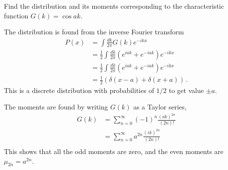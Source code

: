 

Find the distribution and its moments corresponding to the characteristic function $G(k) = \cos ak$.


The distribution is found from the inverse Fourier transform
\begin{align*}
P(x)
  &= \int \frac{dk}{2\pi} G(k) e^{-i k x} \\
  &= \frac{1}{2} \int \frac{dk}{2\pi} \left( e^{i a k} + e^{-i a k} \right) e^{-i k x} \\
  &= \frac{1}{2} \int \frac{dk}{2\pi} \left( e^{i a k} + e^{-i a k} \right) e^{-i k x} \\
  &= \frac{1}{2} \left( \delta (x - a) + \delta(x + a) \right)
  \, .
\end{align*}
This is a discrete distribution with probabilities of $1/2$ to get value $\pm a$.

The moments are found by writing $G(k)$ as a Taylor series,
\begin{align*}
  G(k)
  &= \sum_{n=0}^\infty (-1)^n \frac{(ak)^{2n}}{(2n)!} \\
  &= \sum_{n=0}^\infty a^{2n} \frac{(ik)^{2n}}{(2n)!} \\
\end{align*}
This shows that all the odd moments are zero, and the even moments are $\mu_{2n} = a^{2n}$.
